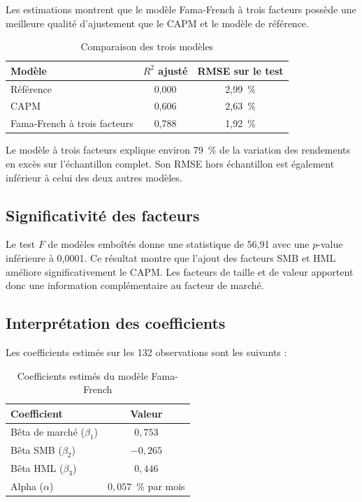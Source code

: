\documentclass[12pt,a4paper]{article}
\begin{document}
Les estimations montrent que le modèle Fama-French à trois facteurs possède une meilleure qualité d'ajustement que le CAPM et le modèle de référence.

\begin{table}[H]
\centering
\begin{tabular}{@{}lcc@{}}
\toprule
\textbf{Modèle} & \textbf{$R^2$ ajusté} & \textbf{RMSE sur le test} \\
\midrule
Référence & 0,000 & 2,99~\% \\
CAPM & 0,606 & 2,63~\% \\
Fama-French à trois facteurs & 0,788 & 1,92~\% \\
\bottomrule
\end{tabular}
\caption{Comparaison des trois modèles}
\end{table}

Le modèle à trois facteurs explique environ 79~\% de la variation des rendements en excès sur l'échantillon complet. Son RMSE hors échantillon est également inférieur à celui des deux autres modèles.

\subsection{Significativité des facteurs}

Le test $F$ de modèles emboîtés donne une statistique de 56,91 avec une $p$-value inférieure à 0,0001. Ce résultat montre que l'ajout des facteurs SMB et HML améliore significativement le CAPM. Les facteurs de taille et de valeur apportent donc une information complémentaire au facteur de marché.

\subsection{Interprétation des coefficients}

Les coefficients estimés sur les 132 observations sont les suivants :

\begin{table}[H]
\centering
\begin{tabular}{@{}lc@{}}
\toprule
\textbf{Coefficient} & \textbf{Valeur} \\
\midrule
Bêta de marché ($\beta_1$) & $0{,}753$ \\
Bêta SMB ($\beta_2$) & $-0{,}265$ \\
Bêta HML ($\beta_3$) & $0{,}446$ \\
Alpha ($\alpha$) & $0{,}057$~\% par mois \\
\bottomrule
\end{tabular}
\caption{Coefficients estimés du modèle Fama-French}
\end{table}
\end{document}
